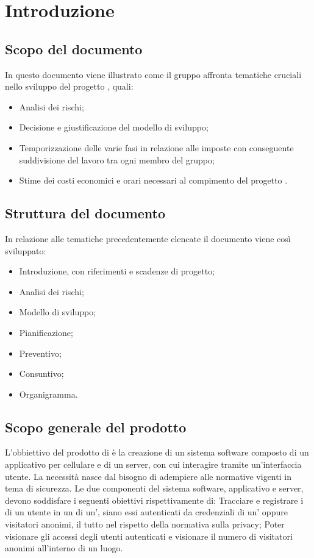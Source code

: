 \section{Introduzione}
\subsection{Scopo del documento}
In questo documento viene illustrato come  il gruppo \Gruppo{} affronta tematiche cruciali nello sviluppo del progetto \NomeProgetto{}, quali:
\begin{itemize}
    \item Analisi dei rischi;
    \item Decisione e giustificazione del modello di sviluppo;
    \item Temporizzazione delle varie fasi in relazione alle  imposte con conseguente suddivisione del lavoro tra ogni membro del gruppo;
    \item Stime dei costi economici e orari necessari al compimento del progetto \NomeProgetto{}.
\end{itemize}

\subsection{Struttura del documento}
In relazione alle tematiche precedentemente elencate il documento viene così sviluppato:
\begin{itemize}
    \item Introduzione, con riferimenti e scadenze di progetto;
    \item Analisi dei rischi;
    \item Modello di sviluppo;
    \item Pianificazione;
    \item Preventivo;
    \item Consuntivo;
    \item Organigramma.
\end{itemize}

\subsection{Scopo generale del prodotto}
L'obbiettivo del prodotto \NomeProgetto{} di \Proponente{} è la creazione di un sistema software composto di un applicativo per cellulare e di un server, con cui interagire tramite un'interfaccia utente. La necessità nasce dal bisogno di adempiere alle normative vigenti in tema di sicurezza.
Le due componenti del sistema software, applicativo e server, devono soddisfare i seguenti obiettivi rispettivamente di:
Tracciare e registrare i  di un utente in un  di un', siano essi autenticati da credenziali di un' oppure visitatori anonimi, il tutto nel rispetto della normativa sulla privacy;
Poter visionare gli accessi degli utenti autenticati e visionare il numero di visitatori anonimi all'interno di un luogo.

